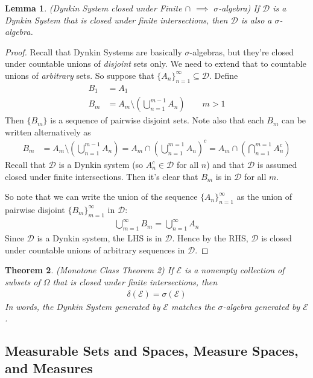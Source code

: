 \documentclass[12pt]{article}
\theoremstyle{plain}
\newtheorem{thm}{Theorem}[section]
\newtheorem{lem}[thm]{Lemma}
\theoremstyle{definition}
\theoremstyle{remark}
\newcommand{\sE}{\mathscr{E}}
\newcommand{\sD}{\mathscr{D}}
\newcommand{\ninf}{_{n=1}^\infty}
\newcommand{\minf}{_{m=1}^\infty}
\begin{document}
\begin{lem}
\label{lem:dynkin-closed}
\emph{(Dynkin System closed under Finite $\cap$ $\implies$ $\sigma$-algebra)}
If $\sD$ is a Dynkin System that is closed under finite intersections,
then $\sD$ is also a $\sigma$-algebra.
\end{lem}
\begin{proof}
Recall that Dynkin Systems are basically $\sigma$-algebras, but they're
closed under countable unions of \emph{disjoint} sets only. We need to
extend that to countable unions of \emph{arbitrary} sets. So suppose
that $\{A_n\}\ninf\subseteq \sD$. Define
\begin{align*}
  B_1 &= A_1 \\
  B_m &= A_m \setminus \left( \bigcup_{n=1}^{m-1} A_n\right)
  \qquad m>1
\end{align*}
Then $\{B_m\}$ is a sequence of pairwise disjoint sets. Note also that
each $B_m$ can be written alternatively as
\begin{align*}
  B_m &= A_m \setminus \left( \bigcup_{n=1}^{m-1} A_n\right)
  = A_m \cap \left( \bigcup^{m=1}_{n=1}A_n\right)^c
  = A_m \cap \left( \bigcap^{m=1}_{n=1}A_n^c\right)
\end{align*}
Recall that $\sD$ is a Dynkin system (so $A^c_n\in \sD$ for all $n$) and
that $\sD$ is assumed closed under finite intersections. Then it's clear
that $B_m$ is in $\sD$ for all $m$.

So note that we can write the union of the sequence $\{A_n\}\ninf$ as
the union of pairwise disjoint $\{B_m\}_{m=1}^\infty$ in $\sD$:
\begin{align*}
  \bigcup\minf B_m = \bigcup\ninf A_n
\end{align*}
Since $\sD$ is a Dynkin system, the LHS is in $\sD$. Hence by the RHS,
$\sD$ is closed under countable unions of arbitrary sequences in $\sD$.
\end{proof}

\begin{thm}\emph{(Monotone Class Theorem 2)}
\label{thm:mct-2}
If $\sE$ is a nonempty collection of subsets of $\Omega$ that is closed
under finite intersections, then
\begin{align*}
  \delta(\sE)=\sigma(\sE)
\end{align*}
In words, the Dynkin System generated by $\sE$ matches the
$\sigma$-algebra generated by $\sE$.
\end{thm}

\subsection{Measurable Sets and Spaces, Measure Spaces, and Measures}
\end{document}
